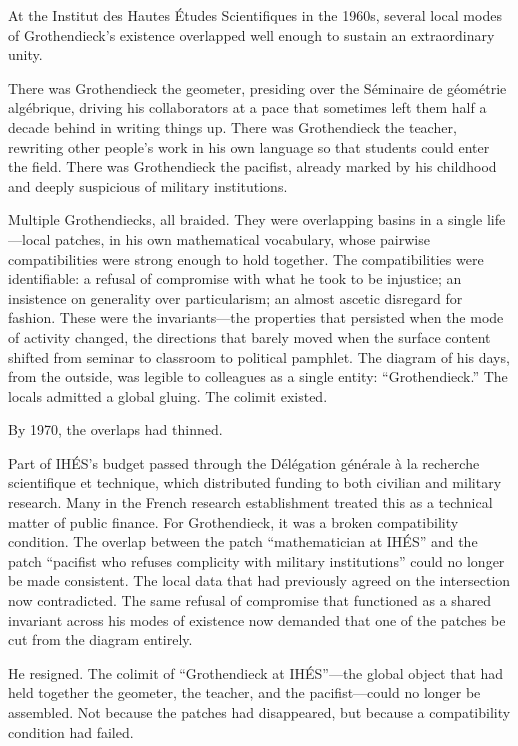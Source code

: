 At the Institut des Hautes \'{E}tudes Scientifiques in the 1960s, several local modes of Grothendieck's existence overlapped well enough to sustain an extraordinary unity.

There was Grothendieck the geometer, presiding over the S\'{e}minaire de g\'{e}om\'{e}trie alg\'{e}brique, driving his collaborators at a pace that sometimes left them half a decade behind in writing things up. There was Grothendieck the teacher, rewriting other people's work in his own language so that students could enter the field. There was Grothendieck the pacifist, already marked by his childhood and deeply suspicious of military institutions.

Multiple Grothendiecks, all braided. They were overlapping basins in a single life---local patches, in his own mathematical vocabulary, whose pairwise compatibilities were strong enough to hold together. The compatibilities were identifiable: a refusal of compromise with what he took to be injustice; an insistence on generality over particularism; an almost ascetic disregard for fashion. These were the invariants---the properties that persisted when the mode of activity changed, the directions that barely moved when the surface content shifted from seminar to classroom to political pamphlet. The diagram of his days, from the outside, was legible to colleagues as a single entity: ``Grothendieck.'' The locals admitted a global gluing. The colimit existed.

By 1970, the overlaps had thinned.

Part of IH\'{E}S's budget passed through the D\'{e}l\'{e}gation g\'{e}n\'{e}rale \`{a} la recherche scientifique et technique, which distributed funding to both civilian and military research. Many in the French research establishment treated this as a technical matter of public finance. For Grothendieck, it was a broken compatibility condition. The overlap between the patch ``mathematician at IH\'{E}S'' and the patch ``pacifist who refuses complicity with military institutions'' could no longer be made consistent. The local data that had previously agreed on the intersection now contradicted. The same refusal of compromise that functioned as a shared invariant across his modes of existence now demanded that one of the patches be cut from the diagram entirely.

He resigned. The colimit of ``Grothendieck at IH\'{E}S''---the global object that had held together the geometer, the teacher, and the pacifist---could no longer be assembled. Not because the patches had disappeared, but because a compatibility condition had failed.

